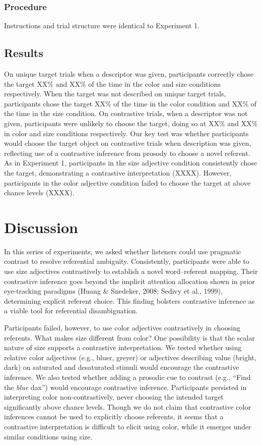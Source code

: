 \documentclass[10pt, letterpaper]{article}
\begin{document}
\subsubsection{Procedure}\label{procedure-1}

Instructions and trial structure were identical to Experiment 1.

\subsection{Results}\label{results-2}

On unique target trials when a descriptor was given, participants
correctly chose the target XX\% and XX\% of the time in the color and
size conditions respectively. When the target was not described on
unique target trials, participants chose the target XX\% of the time in
the color condition and XX\% of the time in the size condition. On
contrastive trials, when a descriptor was not given, participants were
unlikely to choose the target, doing so at XX\% and XX\% in color and
size conditions respectively. Our key test was whether participants
would choose the target object on contrastive trials when description
was given, reflecting use of a contrastive inference from prosody to
choose a novel referent. As in Experiment 1, participants in the size
adjective condition consistently chose the target, demonstrating a
contrastive interpretation (XXXX). However, participants in the color
adjective condition failed to choose the target at above chance levels
(XXXX).

\section{Discussion}\label{discussion}

In this series of experiments, we asked whether listeners could use
pragmatic contrast to resolve referential ambiguity. Consistently,
participants were able to use size adjectives contrastively to establish
a novel word--referent mapping. Their contrastive inference goes beyond
the implicit attention allocation shown in prior eye-tracking paradigms
(Huang \& Snedeker, 2008; Sedivy et al., 1999), determining explicit
referent choice. This finding bolsters contrastive inference as a viable
tool for referential disambiguation.

Participants failed, however, to use color adjectives contrastively in
choosing referents. What makes size different from color? One
possibility is that the scalar nature of size supports a contrastive
interpretation. We tested whether using relative color adjectives (e.g.,
bluer, greyer) or adjectives describing value (bright, dark) on
saturated and desaturated stimuli would encourage the contrastive
inference. We also tested whether adding a prosodic cue to contrast
(e.g., ``Find the \emph{blue} dax'') would encourage contrastive
inference. Participants persisted in interpreting color
non-contrastively, never choosing the intended target significantly
above chance levels. Though we do not claim that contrastive color
inferences cannot be used to explicitly choose referents, it seems that
a contrastive interpretation is difficult to elicit using color, while
it emerges under similar conditions using size.
\end{document}
